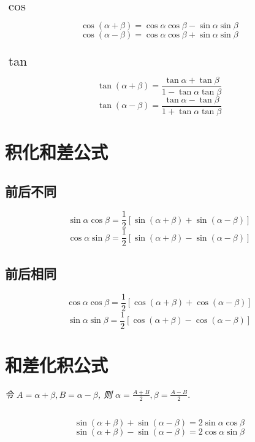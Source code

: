 \documentclass[a4paper, fleqn, fontset = mac]{ctexart}
\newcommand{\diform}{\noindent}
\begin{document}
\begin{multicols}{2}
		\subsection{$\cos$}
		\diform
		\[ \cos\left( \alpha + \beta \right) =
		\cos\alpha\cos\beta - \sin\alpha\sin\beta \]
		\[ \cos\left( \alpha - \beta \right) =
		\cos\alpha\cos\beta + \sin\alpha\sin\beta \] 
	
		\subsection{$\tan$}
		\diform
		\[ \tan\left( \alpha + \beta \right) = 
		\frac{\tan\alpha + \tan\beta}{1 - \tan\alpha\tan\beta}\]
		\[ \tan\left( \alpha - \beta \right) = 
		\frac{\tan\alpha - \tan\beta}{1 + \tan\alpha\tan\beta}\]
	
		\section{积化和差公式}
		\subsection{前后不同}
		\diform
		\[\sin\alpha\cos\beta=\frac{1}{2}\left[
		\sin\left(\alpha+\beta\right)+
		\sin\left(\alpha-\beta\right)\right]\]
		\[\cos\alpha\sin\beta=\frac{1}{2}\left[
		\sin\left(\alpha+\beta\right)-
		\sin\left(\alpha-\beta\right)\right]\]
		
		\subsection{前后相同}
		\diform
		\[\cos\alpha\cos\beta=\frac{1}{2}\left[
		\cos\left(\alpha+\beta\right)+
		\cos\left(\alpha-\beta\right)\right]\]
		\[\sin\alpha\sin\beta=\frac{1}{2}\left[
		\cos\left(\alpha+\beta\right)-
		\cos\left(\alpha-\beta\right)\right]\]
		
		
		\section{和差化积公式}
		\emph{令 $ A = \alpha + \beta, B = \alpha - \beta $, 
		则 $ \alpha = \frac{A+B}{2}, \beta = \frac{A-B}{2} $}.
	
		\subsection{}
		\diform
		\[ \sin(\alpha + \beta) + \sin(\alpha - \beta) = 
		2 \sin\alpha\cos\beta \]
		\[ \sin(\alpha + \beta) - \sin(\alpha - \beta) = 
		2 \cos\alpha\sin\beta \]
		

\end{multicols}
\end{document}
